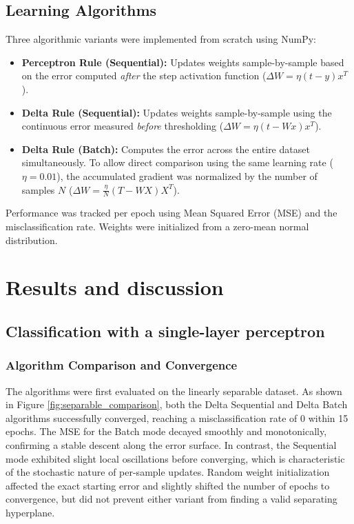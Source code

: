 \documentclass[11pt,a4paper]{article}
\begin{document}
\subsection{Learning Algorithms}
Three algorithmic variants were implemented from scratch using NumPy:
\begin{itemize}
    \item \textbf{Perceptron Rule (Sequential):} Updates weights sample-by-sample based on the error computed \textit{after} the step activation function ($\Delta W = \eta (t - y) x^T$).
    \item \textbf{Delta Rule (Sequential):} Updates weights sample-by-sample using the continuous error measured \textit{before} thresholding ($\Delta W = \eta (t - Wx) x^T$).
    \item \textbf{Delta Rule (Batch):} Computes the error across the entire dataset simultaneously. To allow direct comparison using the same learning rate ($\eta = 0.01$), the accumulated gradient was normalized by the number of samples $N$ ($\Delta W = \frac{\eta}{N} (T - WX) X^T$).
\end{itemize}
Performance was tracked per epoch using Mean Squared Error (MSE) and the misclassification rate. Weights were initialized from a zero-mean normal distribution.

\section{Results and discussion}

\subsection{Classification with a single-layer perceptron}

\subsubsection{Algorithm Comparison and Convergence}
The algorithms were first evaluated on the linearly separable dataset. As shown in Figure \ref{fig:separable_comparison}, both the Delta Sequential and Delta Batch algorithms successfully converged, reaching a misclassification rate of 0 within 15 epochs. The MSE for the Batch mode decayed smoothly and monotonically, confirming a stable descent along the error surface. In contrast, the Sequential mode exhibited slight local oscillations before converging, which is characteristic of the stochastic nature of per-sample updates. Random weight initialization affected the exact starting error and slightly shifted the number of epochs to convergence, but did not prevent either variant from finding a valid separating hyperplane.
\end{document}

